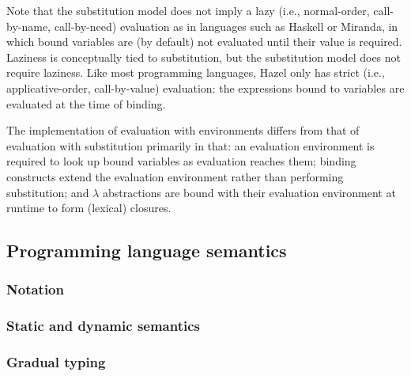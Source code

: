 Note that the substitution model does not imply a lazy (i.e., normal-order, call-by-name, call-by-need) evaluation \cite{plotkin1975call} as in languages such as Haskell or Miranda, in which bound variables are (by default) not evaluated until their value is required. Laziness is conceptually tied to substitution, but the substitution model does not require laziness. Like most programming languages, Hazel only has strict (i.e., applicative-order, call-by-value) evaluation: the expressions bound to variables are evaluated at the time of binding.


The implementation of evaluation with environments differs from that of evaluation with substitution primarily in that: an evaluation environment is required to look up bound variables as evaluation reaches them; binding constructs extend the evaluation environment rather than performing substitution; and $\lambda$ abstractions are bound with their evaluation environment at runtime to form (lexical) closures.

\subsection{Programming language semantics}
\label{sec:type-systems}

\subsubsection{Notation}
\label{sec:semantics-notation}


\subsubsection{Static and dynamic semantics}
\label{sec:static-dynamic-semantics}

\subsubsection{Gradual typing}
\label{sec:gradual}


